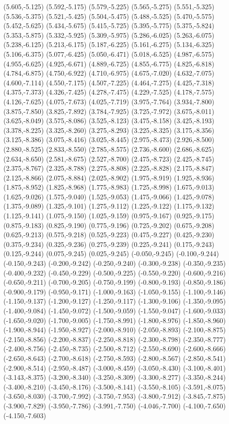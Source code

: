 (5.605,-5.125) (5.592,-5.175) (5.579,-5.225) (5.565,-5.275) (5.551,-5.325) (5.536,-5.375) (5.521,-5.425) (5.504,-5.475) (5.488,-5.525) (5.470,-5.575) (5.452,-5.625) (5.434,-5.675) (5.415,-5.725) (5.395,-5.775) (5.375,-5.824) (5.353,-5.875) (5.332,-5.925) (5.309,-5.975) (5.286,-6.025) (5.263,-6.075) (5.238,-6.125) (5.213,-6.175) (5.187,-6.225) (5.161,-6.275) (5.134,-6.325) (5.106,-6.375) (5.077,-6.425) (5.050,-6.471) (5.018,-6.525) (4.987,-6.575) (4.955,-6.625) (4.925,-6.671) (4.889,-6.725) (4.855,-6.775) (4.825,-6.818) (4.784,-6.875) (4.750,-6.922) (4.710,-6.975) (4.675,-7.020) (4.632,-7.075) (4.600,-7.114) (4.550,-7.175) (4.507,-7.225) (4.464,-7.275) (4.425,-7.318) (4.375,-7.373) (4.326,-7.425) (4.278,-7.475) (4.229,-7.525) (4.178,-7.575) (4.126,-7.625) (4.075,-7.673) (4.025,-7.719) (3.975,-7.764) (3.934,-7.800) (3.875,-7.850) (3.825,-7.892) (3.784,-7.925) (3.725,-7.972) (3.675,-8.011) (3.625,-8.049) (3.575,-8.086) (3.525,-8.123) (3.475,-8.158) (3.425,-8.193) (3.378,-8.225) (3.325,-8.260) (3.275,-8.293) (3.225,-8.325) (3.175,-8.356) (3.125,-8.386) (3.075,-8.416) (3.025,-8.445) (2.975,-8.473) (2.926,-8.500) (2.880,-8.525) (2.833,-8.550) (2.785,-8.575) (2.736,-8.600) (2.686,-8.625) (2.634,-8.650) (2.581,-8.675) (2.527,-8.700) (2.475,-8.723) (2.425,-8.745) (2.375,-8.767) (2.325,-8.788) (2.275,-8.808) (2.225,-8.828) (2.175,-8.847) (2.125,-8.866) (2.075,-8.884) (2.025,-8.902) (1.975,-8.919) (1.925,-8.936) (1.875,-8.952) (1.825,-8.968) (1.775,-8.983) (1.725,-8.998) (1.675,-9.013) (1.625,-9.026) (1.575,-9.040) (1.525,-9.053) (1.475,-9.066) (1.425,-9.078) (1.375,-9.089) (1.325,-9.101) (1.275,-9.112) (1.225,-9.122) (1.175,-9.132) (1.125,-9.141) (1.075,-9.150) (1.025,-9.159) (0.975,-9.167) (0.925,-9.175) (0.875,-9.183) (0.825,-9.190) (0.775,-9.196) (0.725,-9.202) (0.675,-9.208) (0.625,-9.213) (0.575,-9.218) (0.525,-9.223) (0.475,-9.227) (0.425,-9.230) (0.375,-9.234) (0.325,-9.236) (0.275,-9.239) (0.225,-9.241) (0.175,-9.243) (0.125,-9.244) (0.075,-9.245) (0.025,-9.245) (-0.050,-9.245) (-0.100,-9.244) (-0.150,-9.243) (-0.200,-9.242) (-0.250,-9.240) (-0.300,-9.238) (-0.350,-9.235) (-0.400,-9.232) (-0.450,-9.229) (-0.500,-9.225) (-0.550,-9.220) (-0.600,-9.216) (-0.650,-9.211) (-0.700,-9.205) (-0.750,-9.199) (-0.800,-9.193) (-0.850,-9.186) (-0.900,-9.179) (-0.950,-9.171) (-1.000,-9.163) (-1.050,-9.155) (-1.100,-9.146) (-1.150,-9.137) (-1.200,-9.127) (-1.250,-9.117) (-1.300,-9.106) (-1.350,-9.095) (-1.400,-9.084) (-1.450,-9.072) (-1.500,-9.059) (-1.550,-9.047) (-1.600,-9.033) (-1.650,-9.020) (-1.700,-9.005) (-1.750,-8.991) (-1.800,-8.976) (-1.850,-8.960) (-1.900,-8.944) (-1.950,-8.927) (-2.000,-8.910) (-2.050,-8.893) (-2.100,-8.875) (-2.150,-8.856) (-2.200,-8.837) (-2.250,-8.818) (-2.300,-8.798) (-2.350,-8.777) (-2.400,-8.756) (-2.450,-8.735) (-2.500,-8.712) (-2.550,-8.690) (-2.600,-8.666) (-2.650,-8.643) (-2.700,-8.618) (-2.750,-8.593) (-2.800,-8.567) (-2.850,-8.541) (-2.900,-8.514) (-2.950,-8.487) (-3.000,-8.459) (-3.050,-8.430) (-3.100,-8.401) (-3.143,-8.375) (-3.200,-8.340) (-3.250,-8.309) (-3.300,-8.277) (-3.350,-8.244) (-3.400,-8.210) (-3.450,-8.176) (-3.500,-8.141) (-3.550,-8.105) (-3.591,-8.075) (-3.650,-8.030) (-3.700,-7.992) (-3.750,-7.953) (-3.800,-7.912) (-3.845,-7.875) (-3.900,-7.829) (-3.950,-7.786) (-3.991,-7.750) (-4.046,-7.700) (-4.100,-7.650) (-4.150,-7.603) 
